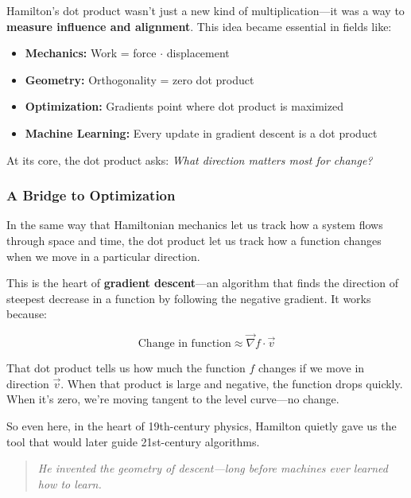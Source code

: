 \begin{tcolorbox}[colback=blue!5!white, colframe=blue!50!black, title={Sidebar: Hamilton's Hidden Legacy—A Geometry of Change}]
Hamilton’s dot product wasn’t just a new kind of multiplication—it was a way to \textbf{measure influence and alignment}.  
This idea became essential in fields like:

\begin{itemize}
    \item \textbf{Mechanics:} Work = force \(\cdot\) displacement
    \item \textbf{Geometry:} Orthogonality = zero dot product
    \item \textbf{Optimization:} Gradients point where dot product is maximized
    \item \textbf{Machine Learning:} Every update in gradient descent is a dot product
\end{itemize}

At its core, the dot product asks: \emph{What direction matters most for change?}
\end{tcolorbox}

\subsubsection*{A Bridge to Optimization}

In the same way that Hamiltonian mechanics let us track how a system flows through space and time, the dot product let us track how a function changes when we move in a particular direction.

This is the heart of \textbf{gradient descent}—an algorithm that finds the direction of steepest decrease in a function by following the negative gradient. It works because:

\[
\text{Change in function} \approx \vec{\nabla}f \cdot \vec{v}
\]

That dot product tells us how much the function \( f \) changes if we move in direction \( \vec{v} \). When that product is large and negative, the function drops quickly. When it’s zero, we’re moving tangent to the level curve—no change.

\medskip

So even here, in the heart of 19th-century physics, Hamilton quietly gave us the tool that would later guide 21st-century algorithms.

\begin{quote}
\textit{He invented the geometry of descent—long before machines ever learned how to learn.}
\end{quote}

